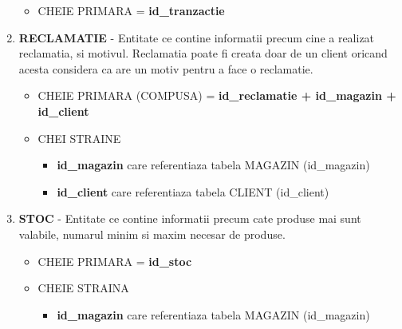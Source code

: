 \begin{enumerate}
    \begin{itemize}
        \item CHEIE PRIMARA = \textbf{id\_tranzactie}
            
    \end{itemize}

    \vspace{0.5cm}

    \item \textbf{RECLAMATIE}
    - Entitate ce contine informatii precum cine a realizat reclamatia,
si motivul. Reclamatia poate fi creata doar de un client oricand acesta considera ca are un motiv pentru a face o reclamatie.

    \begin{itemize}
        \item CHEIE PRIMARA (COMPUSA) = \textbf{id\_reclamatie + id\_magazin + id\_client}
        \item CHEI STRAINE 
                            \begin{itemize}
                                \item \textbf{id\_magazin} care referentiaza tabela MAGAZIN (id\_magazin)
                                \item \textbf{id\_client} care referentiaza tabela CLIENT (id\_client)
                            \end{itemize}
            
    \end{itemize}

    \vspace{0.5cm}
    
    \item \textbf{STOC}
    - Entitate ce contine informatii precum cate produse mai sunt valabile,
numarul minim si maxim necesar de produse.

    \begin{itemize}
        \item CHEIE PRIMARA = \textbf{id\_stoc}
        \item CHEIE STRAINA
                            \begin{itemize}
                                \item \textbf{id\_magazin} care referentiaza tabela MAGAZIN (id\_magazin)
                            \end{itemize}
            
    \end{itemize}

    \vspace{0.5cm}


\end{enumerate}
